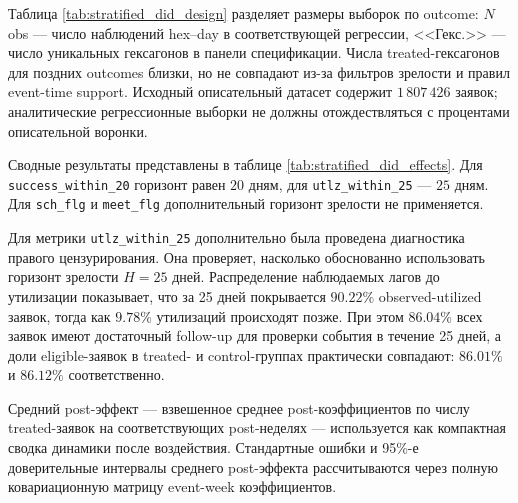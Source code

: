 \documentclass[14pt,a4paper]{extarticle}
\begin{document}
Таблица \ref{tab:stratified_did_design} разделяет размеры выборок по outcome: \(N\) obs --- число наблюдений hex--day в соответствующей регрессии, <<Гекс.>> --- число уникальных гексагонов в панели спецификации. Числа treated-гексагонов для поздних outcomes близки, но не совпадают из-за фильтров зрелости и правил event-time support. Исходный описательный датасет содержит \(1\,807\,426\) заявок; аналитические регрессионные выборки не должны отождествляться с процентами описательной воронки.

Сводные результаты представлены в таблице \ref{tab:stratified_did_effects}. Для \texttt{success\_within\_20} горизонт равен \(20\) дням, для \texttt{utlz\_within\_25} --- \(25\) дням. Для \texttt{sch\_flg} и \texttt{meet\_flg} дополнительный горизонт зрелости не применяется.

Для метрики \texttt{utlz\_within\_25} дополнительно была проведена диагностика правого цензурирования. Она проверяет, насколько обоснованно использовать горизонт зрелости \(H=25\) дней. Распределение наблюдаемых лагов до утилизации показывает, что за 25 дней покрывается \(90.22\%\) observed-utilized заявок, тогда как \(9.78\%\) утилизаций происходят позже. При этом \(86.04\%\) всех заявок имеют достаточный follow-up для проверки события в течение 25 дней, а доли eligible-заявок в treated- и control-группах практически совпадают: \(86.01\%\) и \(86.12\%\) соответственно.

Средний post-эффект --- взвешенное среднее post-коэффициентов по числу treated-заявок на соответствующих post-неделях --- используется как компактная сводка динамики после воздействия. Стандартные ошибки и 95\%-е доверительные интервалы среднего post-эффекта рассчитываются через полную ковариационную матрицу event-week коэффициентов.
\end{document}
